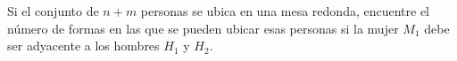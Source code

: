 Si el conjunto de \(n+m\) personas se ubica en una mesa redonda, encuentre el número de formas en las que se pueden ubicar esas personas si la mujer \(M_1\) debe ser adyacente a los hombres \(H_1\) y \(H_2\).
